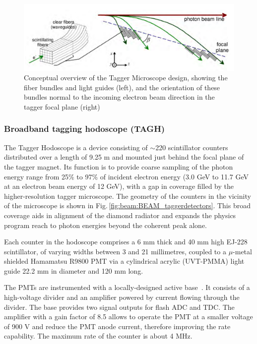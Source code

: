 \begin{figure}[tbh]
\begin{center}
 \includegraphics[clip=true,width=0.95\linewidth]{figures/TAGM_conceptual.pdf}
\end{center}
\caption{Conceptual overview of the Tagger Microscope design, showing the fiber bundles and light guides (left), and the orientation of these bundles normal to the incoming electron beam direction in the tagger focal plane (right)
        }
\label{fig:TAGM_conceptual} 
\end{figure}

\subsubsection{Broadband tagging hodoscope (TAGH)}\label{sec:TAGHIntro}
The Tagger Hodoscope is a device consisting of $\sim$220 scintillator counters distributed over a length of 9.25 m and mounted just behind the focal plane of the tagger magnet.
Its function is to provide coarse sampling of the photon energy range from 25\% to 97\% of incident electron energy (3.0 GeV to 11.7 GeV at an electron beam energy of 12 GeV), with a gap in coverage filled by the higher-resolution tagger microscope. The geometry of the counters in the vicinity of the microscope is shown in Fig.\,\ref{fig:beam:BEAM_taggerdetectors}. 
This broad coverage aids in alignment of the diamond radiator and expands the \GX{} physics program reach to photon energies beyond the coherent peak alone.

Each counter in the hodoscope comprises a 6 mm thick and 40 mm high EJ-228 scintillator, of varying widths between 3 and 21 millimetres, coupled to a $\mu$-metal shielded Hamamatsu R9800 PMT via a cylindrical acrylic (UVT-PMMA) light guide 22.2 mm in diameter and 120 mm long.

The PMTs are instrumented with a locally-designed active base~\cite{tagh:base}.
It consists of a high-voltage divider and an amplifier powered by current flowing through the divider. The base provides two signal outputs for flash ADC and TDC.
The amplifier with a gain factor of 8.5 allows to operate the PMT at  a smaller voltage of 900 V and reduce the PMT anode current, therefore improving the rate capability. The maximum rate of the counter is about 4 MHz.

